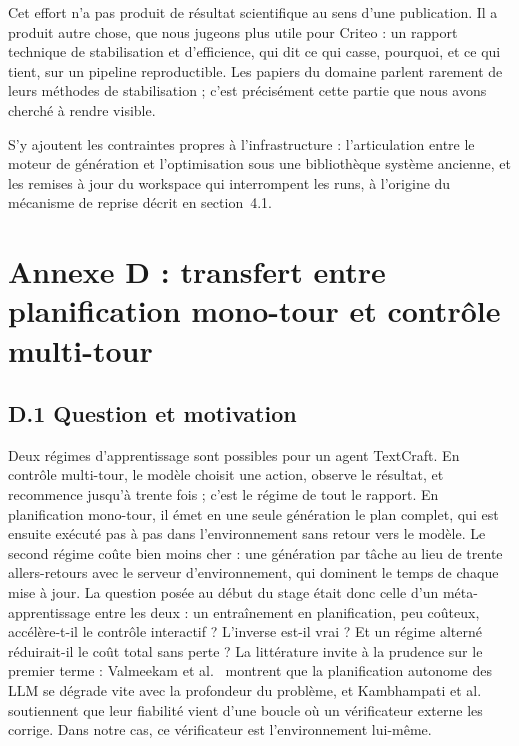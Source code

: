 \documentclass[11pt,a4paper]{article}
\begin{document}
Cet effort n'a pas produit de résultat scientifique au sens d'une publication. Il a produit autre chose, que nous jugeons plus utile pour Criteo : un rapport technique de stabilisation et d'efficience, qui dit ce qui casse, pourquoi, et ce qui tient, sur un pipeline reproductible. Les papiers du domaine parlent rarement de leurs méthodes de stabilisation ; c'est précisément cette partie que nous avons cherché à rendre visible.


S'y ajoutent les contraintes propres à l'infrastructure : l'articulation entre le moteur de génération et l'optimisation sous une bibliothèque système ancienne, et les remises à jour du workspace qui interrompent les runs, à l'origine du mécanisme de reprise décrit en section~4.1.





\section{Annexe D : transfert entre planification mono-tour et contrôle multi-tour}
\label{annexe:transfert}

\subsection*{D.1 Question et motivation}
Deux régimes d'apprentissage sont possibles pour un agent TextCraft. En contrôle multi-tour, le modèle choisit une action, observe le résultat, et recommence jusqu'à trente fois ; c'est le régime de tout le rapport. En planification mono-tour, il émet en une seule génération le plan complet, qui est ensuite exécuté pas à pas dans l'environnement sans retour vers le modèle. Le second régime coûte bien moins cher : une génération par tâche au lieu de trente allers-retours avec le serveur d'environnement, qui dominent le temps de chaque mise à jour. La question posée au début du stage était donc celle d'un méta-apprentissage entre les deux : un entraînement en planification, peu coûteux, accélère-t-il le contrôle interactif ? L'inverse est-il vrai ? Et un régime alterné réduirait-il le coût total sans perte ? La littérature invite à la prudence sur le premier terme : Valmeekam et al.~\cite{valmeekam2023planning} montrent que la planification autonome des LLM se dégrade vite avec la profondeur du problème, et Kambhampati et al.~\cite{kambhampati2024llmmodulo} soutiennent que leur fiabilité vient d'une boucle où un vérificateur externe les corrige. Dans notre cas, ce vérificateur est l'environnement lui-même.
\end{document}
